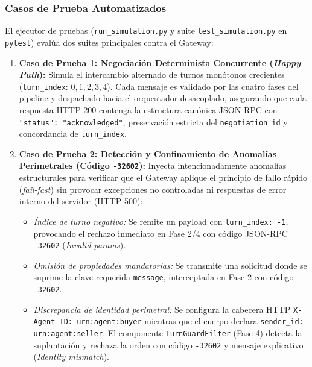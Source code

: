 \subsubsection{Casos de Prueba Automatizados}
El ejecutor de pruebas (\texttt{run\_simulation.py} y suite \texttt{test\_simulation.py} en \texttt{pytest}) evalúa dos suites principales contra el Gateway:
\begin{enumerate}
    \item \textbf{Caso de Prueba 1: Negociación Determinista Concurrente (\textit{Happy Path}):}
    Simula el intercambio alternado de turnos monótonos crecientes (\texttt{turn\_index}: $0, 1, 2, 3, 4$). Cada mensaje es validado por las cuatro fases del pipeline y despachado hacia el orquestador desacoplado, asegurando que cada respuesta HTTP 200 contenga la estructura canónica JSON-RPC con \texttt{"status": "acknowledged"}, preservación estricta del \texttt{negotiation\_id} y concordancia de \texttt{turn\_index}.
    \item \textbf{Caso de Prueba 2: Detección y Confinamiento de Anomalías Perimetrales (Código \texttt{-32602}):}
    Inyecta intencionadamente anomalías estructurales para verificar que el Gateway aplique el principio de fallo rápido (\textit{fail-fast}) sin provocar excepciones no controladas ni respuestas de error interno del servidor (HTTP 500):
    \begin{itemize}
        \item \textit{Índice de turno negativo:} Se remite un payload con \texttt{turn\_index: -1}, provocando el rechazo inmediato en Fase 2/4 con código JSON-RPC \texttt{-32602} (\textit{Invalid params}).
        \item \textit{Omisión de propiedades mandatorias:} Se transmite una solicitud donde se suprime la clave requerida \texttt{message}, interceptada en Fase 2 con código \texttt{-32602}.
        \item \textit{Discrepancia de identidad perimetral:} Se configura la cabecera HTTP \texttt{X-Agent-ID: urn:agent:buyer} mientras que el cuerpo declara \texttt{sender\_id: urn:agent:seller}. El componente \texttt{TurnGuardFilter} (Fase 4) detecta la suplantación y rechaza la orden con código \texttt{-32602} y mensaje explicativo (\textit{Identity mismatch}).
    \end{itemize}
\end{enumerate}


